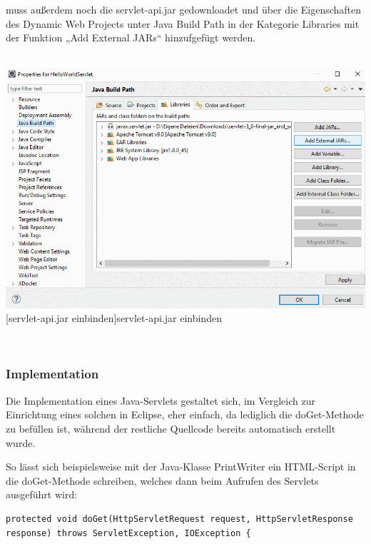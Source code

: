 \documentclass[12pt,a4paper,bibliography=totocnumbered,listof=totocnumbered]{scrartcl}
\begin{document}
\begin{minipage}{\linewidth}
muss außerdem noch die servlet-api.jar gedownloadet und über die Eigenschaften des \glqq Dynamic Web Projects\grqq{} unter \glqq Java Build Path\grqq{} in der Kategorie \glqq Libraries\grqq{} mit der Funktion „Add External JARs“ hinzufgefügt werden.\\
\\
\vspace{1em}
\begin{minipage}{\linewidth}
	\centering
	\includegraphics[width=0.9\linewidth]{Bilder/Eclipse-ServerErstellen4.png}
	[servlet-api.jar einbinden]{servlet-api.jar einbinden}	
	\label{fig:eclipse5}
\end{minipage}
\\
 

\subsubsection{Implementation}
Die Implementation eines Java-Servlets gestaltet sich, im Vergleich zur Einrichtung eines solchen in Eclipse, eher einfach, da lediglich die doGet-Methode zu befüllen ist, während der restliche Quellcode bereits automatisch erstellt wurde.

So lässt sich beispielsweise mit der Java-Klasse PrintWriter ein HTML-Script in die doGet-Methode schreiben, welches dann beim Aufrufen des Servlets ausgeführt wird:


\vspace{1em}
\begin{lstlisting}[caption=Servlet Beispielcode, label=lst:servlet-html]
protected void doGet(HttpServletRequest request, HttpServletResponse response) throws ServletException, IOException {


\end{lstlisting}
\end{minipage}
\end{document}
